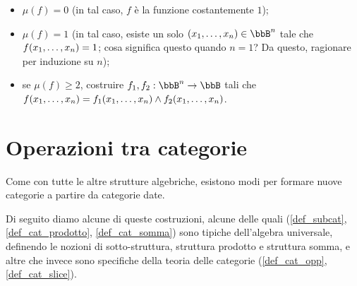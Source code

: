 \begin{enumerate}
    \begin{itemize}
      \item $\mu(f)=0$ (in tal caso, $f$ è la funzione costantemente $1$);
      \item $\mu(f)=1$ (in tal caso, esiste un solo $(\tup xn,)\in \bbB^n$ tale che $f(\tup xn,)=1$; cosa significa questo quando $n=1$? Da questo, ragionare per induzione su $n$);
      \item se $\mu(f)\ge 2$, costruire $f_1,f_2:\bbB^n\to \bbB$ tali che $f(\tup xn,) = f_1(\tup xn,) \land f_2(\tup xn,)$.
    \end{itemize}
\end{enumerate}

\section{Operazioni tra categorie}\label{sec_operazioni}
Come con tutte le altre strutture algebriche, esistono modi per formare nuove categorie a partire da categorie date.

Di seguito diamo alcune di queste costruzioni, alcune delle quali (\ref{def_subcat}, \ref{def_cat_prodotto}, \ref{def_cat_somma}) sono tipiche dell'algebra universale, definendo le nozioni di sotto-struttura, struttura prodotto e struttura somma, e altre che invece sono specifiche della teoria delle categorie (\ref{def_cat_opp}, \ref{def_cat_slice}).

